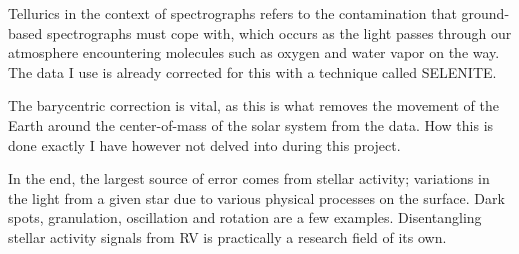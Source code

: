 Tellurics in the context of spectrographs refers to the contamination that ground-based spectrographs must cope with, which occurs as the light passes through our atmosphere encountering molecules such as oxygen and water vapor on the way. The data I use is already corrected for this with a technique called SELENITE\cite{yale_data}.

The barycentric correction is vital, as this is what removes the movement of the Earth around the center-of-mass of the solar system from the data. How this is done exactly I have however not delved into during this project. 

In the end, the largest source of error comes from stellar activity; variations in the light from a given star due to various physical processes on the surface. Dark spots, granulation, oscillation and rotation are a few examples. Disentangling stellar activity signals from RV is practically a research field of its own.

